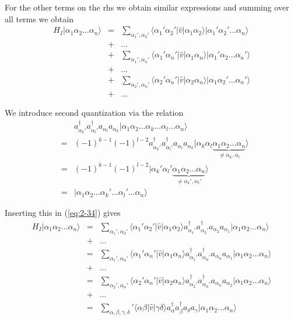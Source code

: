 For the other terms on the rhs we obtain similar expressions  and summing over all terms we obtain
\begin{align}
	H_I |\alpha_1\alpha_2\dots\alpha_n\rangle &=& \sum_{\alpha_1', \alpha_2'} \langle \alpha_1'\alpha_2'|\hat{v}|\alpha_1\alpha_2\rangle
		|\alpha_1'\alpha_2'\dots\alpha_n\rangle \nonumber \\
	&+& \dots \nonumber \\
	&+& \sum_{\alpha_1', \alpha_n'} \langle \alpha_1'\alpha_n'|\hat{v}|\alpha_1\alpha_n\rangle
		|\alpha_1'\alpha_2\dots\alpha_n'\rangle \nonumber \\
	&+& \dots \nonumber \\
	&+& \sum_{\alpha_2', \alpha_n'} \langle \alpha_2'\alpha_n'|\hat{v}|\alpha_2\alpha_n\rangle
		|\alpha_1\alpha_2'\dots\alpha_n'\rangle \nonumber \\
	 &+& \dots \label{eq:2-34}
\end{align}

We introduce second quantization via the relation
\begin{align}
	&& a_{\alpha_k'}^{\dagger} a_{\alpha_l'}^{\dagger} a_{\alpha_l} a_{\alpha_k} 
		|\alpha_1\alpha_2\dots\alpha_k\dots\alpha_l\dots\alpha_n\rangle \nonumber \\
	&=& (-1)^{k-1} (-1)^{l-2} a_{\alpha_k'}^{\dagger} a_{\alpha_l'}^{\dagger} a_{\alpha_l} a_{\alpha_k}
		|\alpha_k\alpha_l \underbrace{\alpha_1\alpha_2\dots\alpha_n}_{\neq \alpha_k,\alpha_l}\rangle \nonumber \\
	&=& (-1)^{k-1} (-1)^{l-2} 
	|\alpha_k'\alpha_l' \underbrace{\alpha_1\alpha_2\dots\alpha_n}_{\neq \alpha_k',\alpha_l'}\rangle \nonumber \\
	&=& |\alpha_1\alpha_2\dots\alpha_k'\dots\alpha_l'\dots\alpha_n\rangle \label{eq:2-35}
\end{align}

Inserting this in (\ref{eq:2-34}) gives
\begin{align}
	H_I |\alpha_1\alpha_2\dots\alpha_n\rangle
	&=& \sum_{\alpha_1', \alpha_2'} \langle \alpha_1'\alpha_2'|\hat{v}|\alpha_1\alpha_2\rangle
		a_{\alpha_1'}^{\dagger} a_{\alpha_2'}^{\dagger} a_{\alpha_2} a_{\alpha_1}
		|\alpha_1\alpha_2\dots\alpha_n\rangle \nonumber \\
	&+& \dots \nonumber \\
	&=& \sum_{\alpha_1', \alpha_n'} \langle \alpha_1'\alpha_n'|\hat{v}|\alpha_1\alpha_n\rangle
		a_{\alpha_1'}^{\dagger} a_{\alpha_n'}^{\dagger} a_{\alpha_n} a_{\alpha_1}
		|\alpha_1\alpha_2\dots\alpha_n\rangle \nonumber \\
	&+& \dots \nonumber \\
	&=& \sum_{\alpha_2', \alpha_n'} \langle \alpha_2'\alpha_n'|\hat{v}|\alpha_2\alpha_n\rangle
		a_{\alpha_2'}^{\dagger} a_{\alpha_n'}^{\dagger} a_{\alpha_n} a_{\alpha_2}
		|\alpha_1\alpha_2\dots\alpha_n\rangle \nonumber \\
	&+& \dots \nonumber \\
	&=& \sum_{\alpha, \beta, \gamma, \delta} ' \langle \alpha\beta|\hat{v}|\gamma\delta\rangle
		a^{\dagger}_\alpha a^{\dagger}_\beta a_\delta a_\gamma
		|\alpha_1\alpha_2\dots\alpha_n\rangle \label{eq:2-36}
\end{align}

